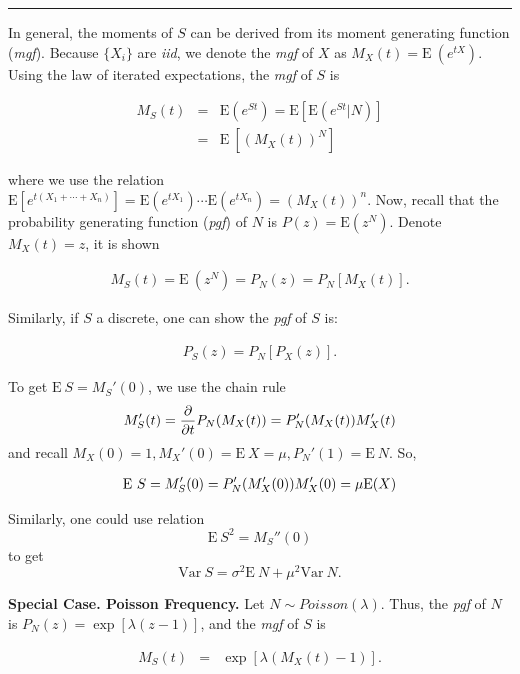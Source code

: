 \documentclass[]{book}
\theoremstyle{definition}
\theoremstyle{definition}
\theoremstyle{definition}
\theoremstyle{remark}
\begin{document}
\begin{center}\rule{0.5\linewidth}{\linethickness}\end{center}

In general, the moments of \(S\) can be derived from its moment
generating function (\emph{mgf}). Because \(\{X_i\}\) are \emph{iid}, we
denote the \emph{mgf} of \(X\) as \(M_{X}(t) = \mathrm{E~}(e^{tX})\).
Using the law of iterated expectations, the \emph{mgf} of \(S\) is

\begin{eqnarray*}
M_{S}(t) &=& \mathrm{E}(e^{St})=\mathrm{E}[\mathrm{E}(e^{St}|N)]\\
&=& \mathrm{E~}[(M_{X}(t))^N]
\end{eqnarray*}

where we use the relation
\(\mathrm{E}[e^{t(X_1+\cdots+X_n)}] = \mathrm{E}(e^{tX_1})\cdots\mathrm{E}(e^{tX_n}) = (M_{X}(t))^n\).
Now, recall that the probability generating function (\emph{pgf}) of
\(N\) is \(P(z) = \mathrm{E}(z^N)\). Denote \(M_{X}(t)=z\), it is shown

\begin{eqnarray*}
M_{S}(t) = \mathrm{E~}(z^N)  = P_{N}(z) = P_{N}[M_{X}(t)].
\end{eqnarray*}

Similarly, if \(S\) a discrete, one can show the \emph{pgf} of \(S\) is:

\begin{eqnarray*}
P_{S}(z) = P_{N}[P_{X}(z)].
\end{eqnarray*}

To get \(\mathrm{E~}S = M_{S}'(0)\), we use the chain rule \[
M_{S}'(t) = \frac{\partial}{\partial t} P_{N}(M_{X}(t)) = P_{N}'(M_{X}(t)) M_{X}'(t)\\
\] and recall
\(M_{X}(0) = 1, M_{X}'(0) = \mathrm{E~}X = \mu, P_{N}'(1) = \mathrm{E~}N\).
So,

\begin{eqnarray*}
\mathrm{E~}S = M_{S}'(0) = P_{N}'(M_{X}'(0)) M_{X}'(0) = \mu {\rm E}(X)
\end{eqnarray*}

Similarly, one could use relation \[
\mathrm{E~}S^2 = M_{S}''(0)
\] to get
\[\mathrm{Var~}S = \sigma^2 \mathrm{E~}N + \mu^2 \mathrm{Var~}N.\]

\textbf{Special Case. Poisson Frequency.} Let
\(N \sim Poisson (\lambda)\). Thus, the \emph{pgf} of \(N\) is
\(P_N (z) =\exp[\lambda(z-1)]\), and the \emph{mgf} of \(S\) is

\begin{eqnarray*}
M_{S}(t) &=&\exp[\lambda(M_{X}(t) - 1)].
\end{eqnarray*}
\end{document}
